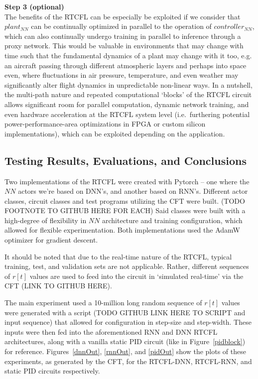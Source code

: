 \documentclass[10pt,twocolumn,letterpaper]{article}
\begin{document}
            \textbf{Step 3 (optional)}\\
            The benefits of the RTCFL can be especially be exploited if we consider that $plant_{NN}$ can be continually
            optimized in parallel to the operation of $controller_{NN}$, which can also continually undergo training in
            parallel to inference through a proxy network. This would be valuable in environments that may change with
            time such that the fundamental dynamics of a plant may change with it too, e.g. an aircraft passing through
            different atmospheric layers and perhaps into space even, where fluctuations in air pressure, temperature,
            and even weather may significantly alter flight dynamics in unpredictable non-linear ways. In a nutshell,
            the multi-path nature and repeated computational `blocks' of the RTCFL circuit allows significant room for
            parallel computation, dynamic network training, and even hardware acceleration at the RTCFL system level
            (i.e.\ furthering potential power-performance-area optimizations in FPGA or custom silicon implementations),
            which can be exploited depending on the application.


        \subsection{Testing Results, Evaluations, and Conclusions} \label{RTCFLtesting}

            Two implementations of the RTCFL were created with Pytorch -- one where the $NN$ actors we're based on
            DNN's, and another based on RNN's. Different actor classes, circuit classes and test programs utilizing the
            CFT were built. (TODO FOOTNOTE TO GITHUB HERE FOR EACH) Said classes were built with a high-degree of
            flexibility in $NN$ architecture and training configuration, which allowed for flexible experimentation.
            Both implementations used the AdamW optimizer for gradient descent.

            It should be noted that due to the real-time nature of the RTCFL, typical training, test, and validation
            sets are not applicable. Rather, different sequences of $r[t]$ values are used to feed into the circuit in
            `simulated real-time' via the CFT (LINK TO GITHUB HERE).

            The main experiment used a 10-million long random sequence of $r[t]$ values were generated with a script
            (TODO GITHUB LINK HERE TO SCRIPT and input sequence) that allowed for configuration in step-size and
            step-width. These inputs were then fed into the aforementioned RNN and DNN RTCFL architectures, along with a
            vanilla static PID circuit (like in Figure~\ref{pidblock}) for reference. Figures~\ref{dnnOut},
            \ref{rnnOut}, and \ref{pidOut} show the plots of these experiments, as generated by the CFT, for the
            RTCFL-DNN, RTCFL-RNN, and static PID circuits respectively.
\end{document}
